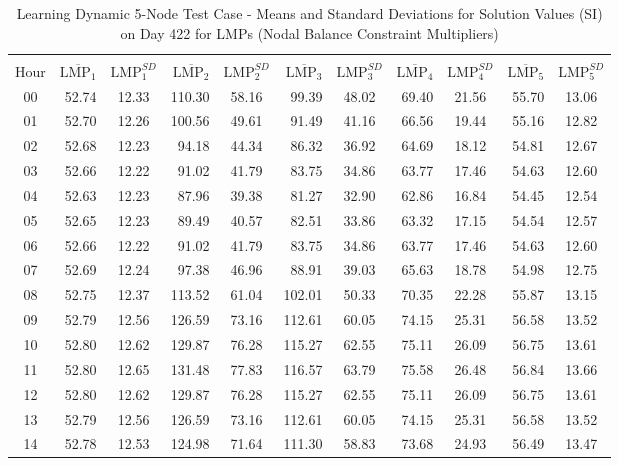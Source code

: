 \documentclass[12pt]{article}
\begin{document}
\begin{table}[h]
	\caption{Learning Dynamic 5-Node Test Case - Means and Standard Deviations for Solution Values (SI) on Day 422 for LMPs (Nodal Balance Constraint Multipliers) } 
	\label{tab: 5Node.Learning.LMPs}
\begin{minipage}{\textwidth}
	\centering
\begin{tabular}{crcrcrcrcrc} 
\hline\hline \\[0.1ex]
Hour & $\overline{\mbox{LMP}_1}$ & $\mbox{LMP}_1^{SD}$ & $\overline{\mbox{LMP}_2}$ & $\mbox{LMP}_2^{SD}$ & $\overline{\mbox{LMP}_3}$ & $\mbox{LMP}_3^{SD}$ & $\overline{\mbox{LMP}_4}$ & $\mbox{LMP}_4^{SD}$ & $\overline{\mbox{LMP}_5}$ & $\mbox{LMP}_5^{SD}$\\
\hline
00	&	52.74	&	12.33	&	110.30	&	58.16	&	99.39	&	48.02	&	69.40	&	21.56	&	55.70	&	13.06	\\
01	&	52.70	&	12.26	&	100.56	&	49.61	&	91.49	&	41.16	&	66.56	&	19.44	&	55.16	&	12.82	\\
02	&	52.68	&	12.23	&	94.18	&	44.34	&	86.32	&	36.92	&	64.69	&	18.12	&	54.81	&	12.67	\\
03	&	52.66	&	12.22	&	91.02	&	41.79	&	83.75	&	34.86	&	63.77	&	17.46	&	54.63	&	12.60	\\
04	&	52.63	&	12.23	&	87.96	&	39.38	&	81.27	&	32.90	&	62.86	&	16.84	&	54.45	&	12.54	\\
05	&	52.65	&	12.23	&	89.49	&	40.57	&	82.51	&	33.86	&	63.32	&	17.15	&	54.54	&	12.57	\\
06	&	52.66	&	12.22	&	91.02	&	41.79	&	83.75	&	34.86	&	63.77	&	17.46	&	54.63	&	12.60	\\
07	&	52.69	&	12.24	&	97.38	&	46.96	&	88.91	&	39.03	&	65.63	&	18.78	&	54.98	&	12.75	\\
08	&	52.75	&	12.37	&	113.52	&	61.04	&	102.01	&	50.33	&	70.35	&	22.28	&	55.87	&	13.15	\\
09	&	52.79	&	12.56	&	126.59	&	73.16	&	112.61	&	60.05	&	74.15	&	25.31	&	56.58	&	13.52	\\
10	&	52.80	&	12.62	&	129.87	&	76.28	&	115.27	&	62.55	&	75.11	&	26.09	&	56.75	&	13.61	\\
11	&	52.80	&	12.65	&	131.48	&	77.83	&	116.57	&	63.79	&	75.58	&	26.48	&	56.84	&	13.66	\\
12	&	52.80	&	12.62	&	129.87	&	76.28	&	115.27	&	62.55	&	75.11	&	26.09	&	56.75	&	13.61	\\
13	&	52.79	&	12.56	&	126.59	&	73.16	&	112.61	&	60.05	&	74.15	&	25.31	&	56.58	&	13.52	\\
14	&	52.78	&	12.53	&	124.98	&	71.64	&	111.30	&	58.83	&	73.68	&	24.93	&	56.49	&	13.47	\\

\end{tabular}
\end{minipage}
\end{table}
\end{document}
